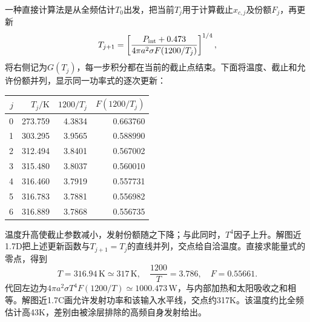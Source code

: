 \documentclass[UTF8,fontset=fandol,a4paper,11pt]{ctexart}
\begin{document}
一种直接计算法是从全频估计$T_0$出发，把当前$T_j$用于计算截止$x_{c,j}$及份额$F_j$，再更新
\[
T_{j+1}=\left[
\frac{P_{\rm int}+0.473}{4\pi a^2\sigma F(1200/T_j)}
\right]^{1/4},
\]
将右侧记为$G(T_j)$，每一步积分都在当前的截止点结束。下面将温度、截止和允许份额并列，显示同一功率式的逐次更新：
\begin{center}\begin{tabular}{r|rrr}
$j$ & $T_j/\mathrm K$ & $1200/T_j$ & $F(1200/T_j)$\\\hline
0 & 273.759 & 4.3834 & 0.663760\\
1 & 303.295 & 3.9565 & 0.588990\\
2 & 312.494 & 3.8401 & 0.567002\\
3 & 315.480 & 3.8037 & 0.560010\\
4 & 316.460 & 3.7919 & 0.557731\\
5 & 316.783 & 3.7881 & 0.556982\\
6 & 316.889 & 3.7868 & 0.556735\\
\end{tabular}\end{center}
温度升高使截止参数减小，发射份额随之下降；与此同时，$T^4$因子上升。解图近1.7D把上述更新函数与$T_{j+1}=T_j$的直线并列，交点给自洽温度。直接求能量式的零点，得到
\[
\boxed{T=316.94\,\mathrm K\simeq317\,\mathrm K},
\quad \frac{1200}{T}=3.786,\quad F=0.55661.
\]
代回左边为$4\pi a^2\sigma T^4F(1200/T)\simeq1000.473\,\mathrm W$，与内部加热和太阳吸收之和相等。解图近1.7C画允许发射功率和该输入水平线，交点约317K。该温度约比全频估计高43K，差别由被涂层排除的高频自身发射给出。
\end{document}
